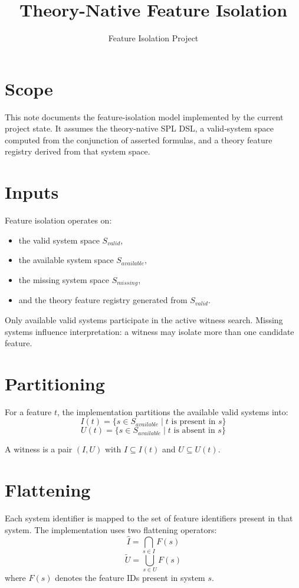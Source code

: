 \documentclass[english,10pt,a4paper,onecolumn]{article}
\title{Theory-Native Feature Isolation}
\author{Feature Isolation Project}
\date{}
\begin{document}
\maketitle

\section{Scope}
This note documents the feature-isolation model implemented by the current
project state. It assumes the theory-native SPL DSL, a valid-system space
computed from the conjunction of asserted formulas, and a theory feature
registry derived from that system space.

\section{Inputs}
Feature isolation operates on:
\begin{itemize}[leftmargin=*]
\item the valid system space $S_{valid}$,
\item the available system space $S_{available}$,
\item the missing system space $S_{missing}$,
\item and the theory feature registry generated from $S_{valid}$.
\end{itemize}

Only available valid systems participate in the active witness search.
Missing systems influence interpretation: a witness may isolate more than one
candidate feature.

\section{Partitioning}
For a feature $t$, the implementation partitions the available valid systems
into:
\[
I(t) = \{ s \in S_{available} \mid t \text{ is present in } s \}
\]
\[
U(t) = \{ s \in S_{available} \mid t \text{ is absent in } s \}
\]

A witness is a pair $(I, U)$ with $I \subseteq I(t)$ and $U \subseteq U(t)$.

\section{Flattening}
Each system identifier is mapped to the set of feature identifiers present in
that system. The implementation uses two flattening operators:
\[
\widehat{I} = \bigcap_{s \in I} F(s)
\]
\[
\widetilde{U} = \bigcup_{s \in U} F(s)
\]
where $F(s)$ denotes the feature IDs present in system $s$.
\end{document}
